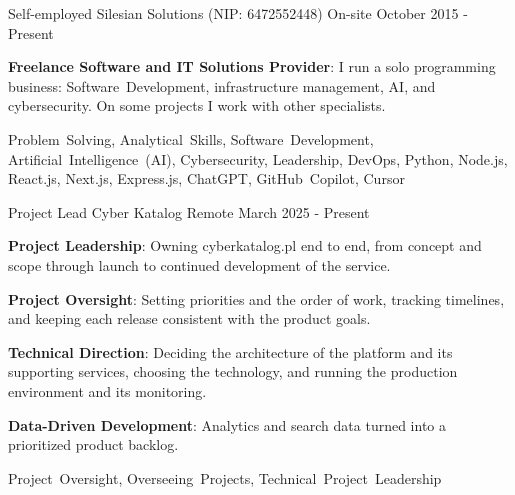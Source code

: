 
\begin{cventries}

  \cventry
    {Self-employed} %
    {Silesian Solutions (NIP: 6472552448)} %
    {On-site} %
    {October 2015 - Present} %
    {
      \begin{cvitems} %
        \item {\textbf{Freelance Software and IT Solutions Provider}: I run a solo programming business: Software~Development, infrastructure management, AI, and cybersecurity. On some projects I work with other specialists.}
      \end{cvitems}
    }
    {Problem~Solving, Analytical~Skills, Software~Development, Artificial~Intelligence~(AI), Cybersecurity, Leadership, DevOps, Python, Node.js, React.js, Next.js, Express.js, ChatGPT, GitHub~Copilot, Cursor}

  \cventry
    {Project Lead} %
    {Cyber Katalog} %
    {Remote} %
    {March 2025 - Present} %
    {
      \begin{cvitems} %
        \item {\textbf{Project Leadership}: Owning cyberkatalog.pl end to end, from concept and scope through launch to continued development of the service.}
        \item {\textbf{Project Oversight}: Setting priorities and the order of work, tracking timelines, and keeping each release consistent with the product goals.}
        \item {\textbf{Technical Direction}: Deciding the architecture of the platform and its supporting services, choosing the technology, and running the production environment and its monitoring.}
        \item {\textbf{Data-Driven Development}: Analytics and search data turned into a prioritized product backlog.}
      \end{cvitems}
    }
    {Project~Oversight, Overseeing~Projects, Technical~Project~Leadership}


\end{cventries}
